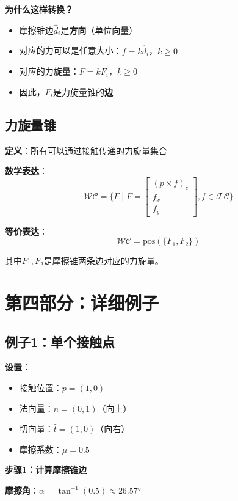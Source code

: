 \documentclass[12pt,a4paper]{article}
\begin{document}
\textbf{为什么这样转换？}
\begin{itemize}
\item 摩擦锥边$\hat{d}_i$是\textbf{方向}（单位向量）
\item 对应的力可以是任意大小：$f = k \hat{d}_i$，$k \geq 0$
\item 对应的力旋量：$F = k F_i$，$k \geq 0$
\item 因此，$F_i$是力旋量锥的\textbf{边}
\end{itemize}

\subsection{力旋量锥}

\textbf{定义}：所有可以通过接触传递的力旋量集合

\textbf{数学表达}：
\begin{equation}
\mathcal{WC} = \{F \mid F = \begin{bmatrix} (p \times f)_z \\ f_x \\ f_y \end{bmatrix}, f \in \mathcal{FC}\}
\end{equation}

\textbf{等价表达}：
\begin{equation}
\mathcal{WC} = \text{pos}(\{F_1, F_2\})
\end{equation}

其中$F_1, F_2$是摩擦锥两条边对应的力旋量。

\section{第四部分：详细例子}

\subsection{例子1：单个接触点}

\textbf{设置}：
\begin{itemize}
\item 接触位置：$p = (1, 0)$
\item 法向量：$\hat{n} = (0, 1)$（向上）
\item 切向量：$\hat{t} = (1, 0)$（向右）
\item 摩擦系数：$\mu = 0.5$
\end{itemize}

\textbf{步骤1：计算摩擦锥边}

\textbf{摩擦角}：$\alpha = \tan^{-1}(0.5) \approx 26.57°$
\end{document}

